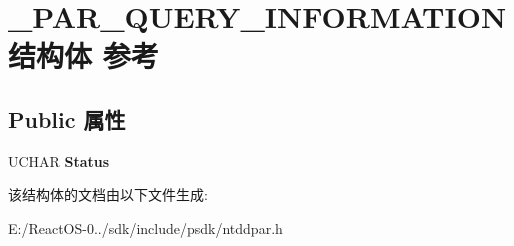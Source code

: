 \hypertarget{struct___p_a_r___q_u_e_r_y___i_n_f_o_r_m_a_t_i_o_n}{}\section{\+\_\+\+P\+A\+R\+\_\+\+Q\+U\+E\+R\+Y\+\_\+\+I\+N\+F\+O\+R\+M\+A\+T\+I\+O\+N结构体 参考}
\label{struct___p_a_r___q_u_e_r_y___i_n_f_o_r_m_a_t_i_o_n}
\subsection*{Public 属性}
\begin{DoxyCompactItemize}
\item 
\mbox{\label{struct___p_a_r___q_u_e_r_y___i_n_f_o_r_m_a_t_i_o_n_a83ab035986872cf3d1904a59ee333f0d}} 
U\+C\+H\+AR {\bfseries Status}
\end{DoxyCompactItemize}


该结构体的文档由以下文件生成\+:\begin{DoxyCompactItemize}
\item 
E\+:/\+React\+O\+S-\/0../sdk/include/psdk/ntddpar.\+h\end{DoxyCompactItemize}
